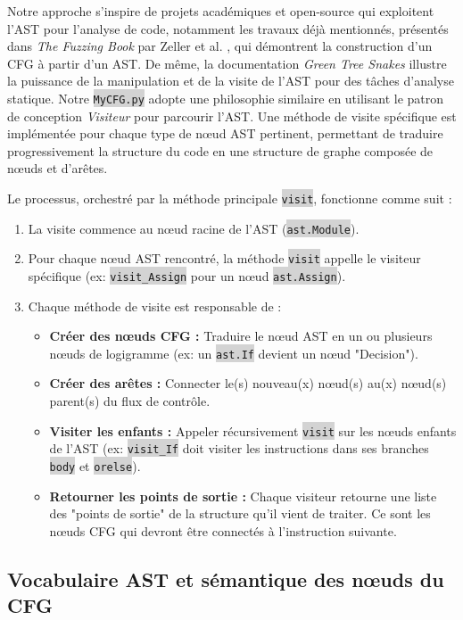 \documentclass[11pt,a4paper]{article}
\let\cite\parencite
\newcommand{\code}[1]{\colorbox{lightgray}{\texttt{\small #1}}}
\begin{document}
Notre approche s'inspire de projets académiques et open-source qui exploitent l'AST pour l'analyse de code, 
notamment les travaux déjà mentionnés, présentés dans \textit{The Fuzzing Book} par Zeller et al. \cite{fuzzingbook}, qui 
démontrent la construction d'un CFG à partir d'un AST. De même, la documentation \textit{Green Tree Snakes} 
\cite{greentreesnakes} illustre la puissance de la manipulation et de la visite de l'AST pour des tâches 
d'analyse statique. Notre \code{MyCFG.py} adopte une philosophie similaire en utilisant le patron de conception 
\textit{Visiteur} pour parcourir l'AST. Une méthode de visite spécifique est implémentée pour chaque type de 
nœud AST pertinent, permettant de traduire progressivement la structure du code en une structure de graphe 
composée de nœuds et d'arêtes.

Le processus, orchestré par la méthode principale \code{visit}, fonctionne comme suit :
\begin{enumerate}
    \item La visite commence au nœud racine de l'AST (\code{ast.Module}).
    \item Pour chaque nœud AST rencontré, la méthode \code{visit} appelle le visiteur spécifique (ex: \code{visit\_Assign} pour un nœud \code{ast.Assign}).
    \item Chaque méthode de visite est responsable de :
    \begin{itemize}
        \item \textbf{Créer des nœuds CFG :} Traduire le nœud AST en un ou plusieurs nœuds de logigramme (ex: un \code{ast.If} devient un nœud "Decision").
        \item \textbf{Créer des arêtes :} Connecter le(s) nouveau(x) nœud(s) au(x) nœud(s) parent(s) du flux de contrôle.
        \item \textbf{Visiter les enfants :} Appeler récursivement \code{visit} sur les nœuds enfants de l'AST (ex: \code{visit\_If} doit visiter les instructions dans ses branches \code{body} et \code{orelse}).
        \item \textbf{Retourner les points de sortie :} Chaque visiteur retourne une liste des "points de sortie" de la structure qu'il vient de traiter. Ce sont les nœuds CFG qui devront être connectés à l'instruction suivante.
    \end{itemize}
\end{enumerate}

 \clearpage
\subsection{Vocabulaire AST et sémantique des nœuds du CFG}
\end{document}
